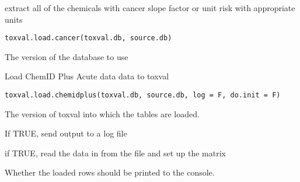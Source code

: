 \documentclass[letterpaper]{book}
\begin{document}
%
\begin{Description}\relax
extract all of the chemicals with cancer slope factor or unit risk with appropriate units
\end{Description}
%
\begin{Usage}
\begin{verbatim}
toxval.load.cancer(toxval.db, source.db)
\end{verbatim}
\end{Usage}
%
\begin{Arguments}
\begin{ldescription}
\item[\code{toxval.db}] The version of the database to use
\end{ldescription}
\end{Arguments}
%
\begin{Description}\relax
Load ChemID Plus Acute data data to toxval
\end{Description}
%
\begin{Usage}
\begin{verbatim}
toxval.load.chemidplus(toxval.db, source.db, log = F, do.init = F)
\end{verbatim}
\end{Usage}
%
\begin{Arguments}
\begin{ldescription}
\item[\code{toxval.db}] The version of toxval into which the tables are loaded.

\item[\code{log}] If TRUE, send output to a log file

\item[\code{do.init}] if TRUE, read the data in from the file and set up the matrix

\item[\code{verbose}] Whether the loaded rows should be printed to the console.
\end{ldescription}
\end{Arguments}
\end{document}
